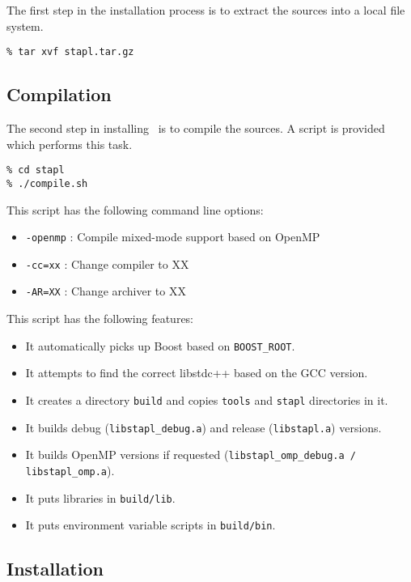 \documentclass{report}
\begin{document}
The first step in the installation process is to extract the sources
into a local file system.

\begin{verbatim}
% tar xvf stapl.tar.gz
\end{verbatim}

\subsection{Compilation}

The second step in installing \stapl\ is to compile the sources.
A script is provided which performs this task.

\begin{verbatim}
% cd stapl
% ./compile.sh
\end{verbatim}

This script has the following command line options:
\begin{itemize}
\item
\texttt{-openmp} : Compile mixed-mode support based on OpenMP
\item
\texttt{-cc=xx} : Change compiler to XX
\item
\texttt{-AR=XX} : Change archiver to XX
\end{itemize}

This script has the following features:

\begin{itemize}
\item
It automatically picks up Boost based on \texttt{BOOST\_ROOT}.
\item
It attempts to find the correct libstdc++ based on the GCC version.
\item
It creates a directory 
\texttt{build} and copies \texttt{tools} and \texttt{stapl} directories in it.
\item
It builds debug (\texttt{libstapl\_debug.a}) and release 
(\texttt{libstapl.a}) versions.
\item
It builds OpenMP versions if requested 
(\texttt{libstapl\_omp\_debug.a / libstapl\_omp.a}).
\item
It puts libraries in \texttt{build/lib}.
\item
It puts environment variable scripts in \texttt{build/bin}.
\end{itemize}

\subsection{Installation}
\end{document}
